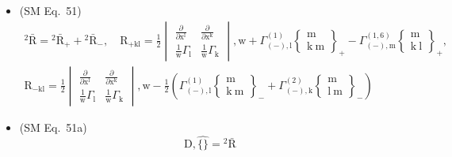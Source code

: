 \documentclass[12pt]{article}
\begin{document}
\begin{itemize}[label={},leftmargin=0pt]
    \item (SM Eq.\ 51) 
    \[
    \begin{gathered}
    {}^2\bar{\mathrm{R}} = {}^2\bar{\mathrm{R}}_+ + {}^2\bar{\mathrm{R}}_-, \quad \mathrm{R}_{\mathrm{+kl}} = \frac{1}{2}\begin{vmatrix} \frac{\partial}{\partial \mathrm{x^l}} & \frac{\partial}{\partial \mathrm{x^k}} \\ \frac{1}{\mathrm{w}}\Gamma_\mathrm{l} & \frac{1}{\mathrm{w}}\Gamma_\mathrm{k} \end{vmatrix}, \mathrm{w} + \Gamma^{(1)}_{(-),\mathrm{l}} \left\{ \begin{smallmatrix} \mathrm{m} \\ \mathrm{k\ m} \end{smallmatrix} \right\} _+ - \Gamma^{(1,6)}_{(-),\mathrm{m}} \left\{ \begin{smallmatrix} \mathrm{m} \\ \mathrm{k\ l} \end{smallmatrix} \right\}_+, \\
    \mathrm{R}_{\mathrm{-kl}} = \frac{1}{2}\begin{vmatrix} \frac{\partial}{\partial \mathrm{x^l}} & \frac{\partial}{\partial \mathrm{x^k}} \\ \frac{1}{\mathrm{w}}\Gamma_\mathrm{l} & \frac{1}{\mathrm{w}}\Gamma_\mathrm{k} \end{vmatrix}, \mathrm{w} - \frac{1}{2}\left( \Gamma^{(1)}_{(-),\mathrm{l}} \left\{ \begin{smallmatrix} \mathrm{m} \\ \mathrm{k\ m} \end{smallmatrix} \right\}_- + \Gamma^{(2)}_{(-),\mathrm{k}} \left\{ \begin{smallmatrix} \mathrm{m} \\ \mathrm{l\ m} \end{smallmatrix} \right\}_- \right)
    \end{gathered}
    \]

    \item (SM Eq.\ 51a) 
    \[
    \mathrm{D}, \widehat{\{\}} = {}^2\bar{\mathrm{R}}
    \]


\end{itemize}
\end{document}
